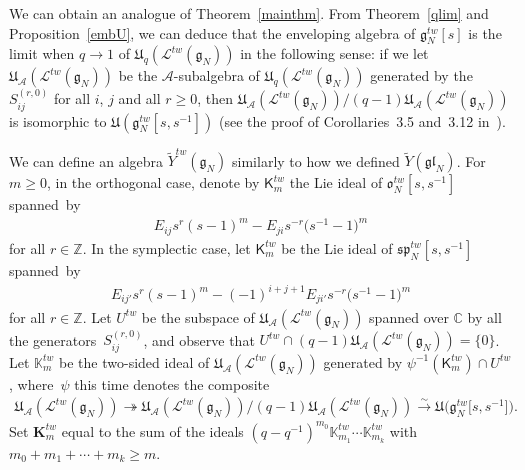 We can obtain an analogue of Theorem~\ref{mainthm}.
From Theorem~\ref{qlim} and Proposition~\ref{embU}, we can deduce that the enveloping algebra of
$\mathfrak{g}_N^{tw}[s]$ is the limit when $q\rightarrow 1$ of $\mathfrak{U}_q(\mathcal{L}^{tw}(\mathfrak{g}_N))$ in the
following sense: if we let $\mathfrak{U}_{\mathcal{A}}(\mathcal{L}^{tw}(\mathfrak{g}_N))$ be the
$\mathcal{A}$-subalgebra of $\mathfrak{U}_q(\mathcal{L}^{tw}(\mathfrak{g}_N))$ generated by the $S_{ij}^{(r,0)}$ for all
$i$, $j$ and all $r\ge 0$, then
$\mathfrak{U}_{\mathcal{A}}(\mathcal{L}^{tw}(\mathfrak{g}_N))/(q-1)\mathfrak{U}_{\mathcal{A}}(\mathcal{L}^{tw}(\mathfrak{g}_N))$
is isomorphic to $\mathfrak{U}(\mathfrak{g}_N^{tw}[s,s^{-1}])$ (see the proof of Corollaries~3.5 and~3.12
in~\cite{MRS}).

We can def\/ine an algebra $\widetilde{Y}^{tw}(\mathfrak{g}_N)$ similarly to how we def\/ined
$\widetilde{Y}(\mathfrak{gl}_N)$.
For $m\ge 0$, in the orthogonal case, denote by $\mathsf{K}_m^{tw}$ the Lie ideal of $\mathfrak{o}_N^{tw}[s,s^{-1}]$
spanned~by
\begin{gather*}
E_{ij} s^r(s-1)^m - E_{ji} s^{-r} \big(s^{-1}-1\big)^m
\end{gather*}
for all $r \in \mathbb{Z}$.
In the symplectic case, let $\mathsf{K}_m^{tw}$ be the Lie ideal of $\mathfrak{sp}_N^{tw}[s,s^{-1}]$ spanned~by
\begin{gather*}
E_{ij'}s^r(s-1)^m - (-1)^{i+j+1} E_{ji'} s^{-r}\big(s^{-1}-1\big)^m
\end{gather*}
for all $r \in \mathbb{Z}$.
Let $U^{tw}$ be the subspace of $\mathfrak{U}_{\mathcal{A}}(\mathcal{L}^{tw}(\mathfrak{g}_N))$ spanned over $\mathbb{C}$
by all the genera\-tors~$S_{ij}^{(r,0)}$, and observe that $U^{tw}\cap
(q-1)\mathfrak{U}_{\mathcal{A}}(\mathcal{L}^{tw}(\mathfrak{g}_N)) = \{0 \}$.
Let $\mathbb{K}_m^{tw}$ be the two-sided ideal of $\mathfrak{U}_{\mathcal{A}}(\mathcal{L}^{tw}(\mathfrak{g}_N))$
generated by $\psi^{-1}(\mathsf{K}_m^{tw})\cap U^{tw}$, where~$\psi$ this time denotes the composite
\begin{gather*}
\mathfrak{U}_{\mathcal{A}}(\mathcal{L}^{tw}(\mathfrak{g}_N)) \twoheadrightarrow
\mathfrak{U}_{\mathcal{A}}(\mathcal{L}^{tw}(\mathfrak{g}_N))/(q-1)\mathfrak{U}_{\mathcal{A}}(\mathcal{L}^{tw}(\mathfrak{g}_N))
\stackrel{\sim}{\longrightarrow} \mathfrak{U}\big(\mathfrak{g}_N^{tw}\big[s,s^{-1}\big]\big).
\end{gather*}
Set $\mathbf{K}_m^{tw}$ equal to the sum of the ideals $(q-q^{-1})^{m_0} \mathbb{K}_{m_1}^{tw}\cdots
\mathbb{K}_{m_k}^{tw}$ with $m_0+m_1+\cdots + m_k \geq m$.


